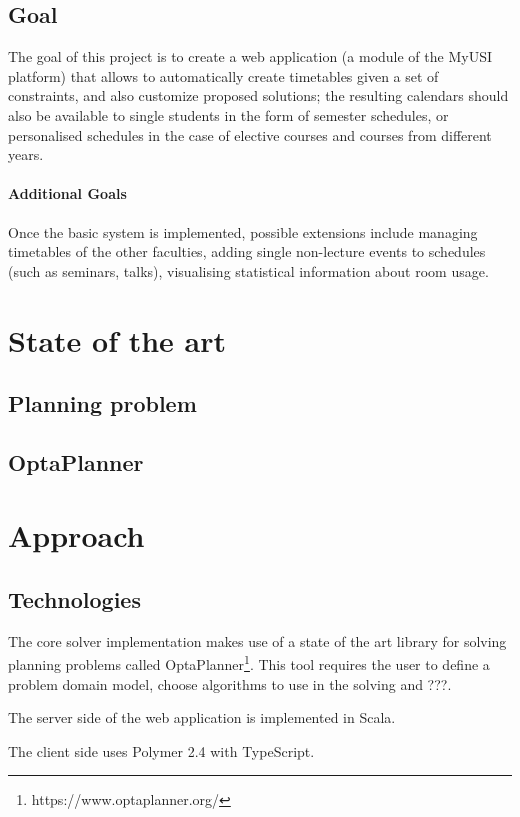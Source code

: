 \documentclass[12pt, a4paper, english]{report}
\begin{document}
\section{Goal}
The goal of this project is to create a web application (a module of the MyUSI platform) that allows to automatically create timetables given a set of constraints, and also customize proposed solutions; the resulting calendars should also be available to single students in the form of semester schedules, or personalised schedules in the case of elective courses and courses from different years.

\subsubsection{Additional Goals}
Once the basic system is implemented, possible extensions include managing timetables of the other faculties, adding single non-lecture events to schedules (such as seminars, talks), visualising statistical information about room usage.

\chapter{State of the art}
\section{Planning problem}
\section{OptaPlanner}

\chapter{Approach}
\section{Technologies}
The core solver implementation makes use of a state of the art library for solving planning problems called OptaPlanner\footnote{https://www.optaplanner.org/}. This tool requires the user to define a problem domain model, choose algorithms to use in the solving and ???.\par
The server side of the web application is implemented in Scala.\par
The client side uses Polymer 2.4 with TypeScript.
\end{document}
